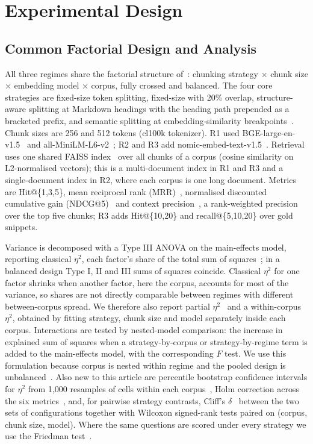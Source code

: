 \documentclass[runningheads]{llncs}
\begin{document}
\section{Experimental Design}
\label{sec:design}

\subsection{Common Factorial Design and Analysis}
All three regimes share the factorial structure of~\cite{chauhan2026chunking}: chunking strategy $\times$ chunk size $\times$ embedding model $\times$ corpus, fully crossed and balanced. The four core strategies are fixed-size token splitting, fixed-size with 20\% overlap, structure-aware splitting at Markdown headings with the heading path prepended as a bracketed prefix, and semantic splitting at embedding-similarity breakpoints~\cite{kamradt2023}. Chunk sizes are 256 and 512 tokens (cl100k tokenizer). R1 used BGE-large-en-v1.5~\cite{xiao2023cpack} and all-MiniLM-L6-v2~\cite{reimers2019sbert}; R2 and R3 add nomic-embed-text-v1.5~\cite{nussbaum2024nomic}. Retrieval uses one shared FAISS index~\cite{johnson2021faiss} over all chunks of a corpus (cosine similarity on L2-normalised vectors); this is a multi-document index in R1 and R3 and a single-document index in R2, where each corpus is one long document. Metrics are Hit@\{1,3,5\}, mean reciprocal rank (MRR)~\cite{craswell2009mrr}, normalised discounted cumulative gain (NDCG@5)~\cite{jarvelin2002ndcg} and context precision~\cite{es2024ragas}, a rank-weighted precision over the top five chunks; R3 adds Hit@\{10,20\} and recall@\{5,10,20\} over gold snippets.

Variance is decomposed with a Type III ANOVA on the main-effects model, reporting classical $\eta^2$, each factor's share of the total sum of squares~\cite{richardson2011,lakens2013}; in a balanced design Type I, II and III sums of squares coincide. Classical $\eta^2$ for one factor shrinks when another factor, here the corpus, accounts for most of the variance, so shares are not directly comparable between regimes with different between-corpus spread. We therefore also report partial $\eta^2$~\cite{richardson2011} and a within-corpus $\eta^2$, obtained by fitting strategy, chunk size and model separately inside each corpus. Interactions are tested by nested-model comparison: the increase in explained sum of squares when a strategy-by-corpus or strategy-by-regime term is added to the main-effects model, with the corresponding $F$ test. We use this formulation because corpus is nested within regime and the pooled design is unbalanced~\cite{langsrud2003}. Also new to this article are percentile bootstrap confidence intervals for $\eta^2$ from 1,000 resamples of cells within each corpus~\cite{efron1986bootstrap}, Holm correction across the six metrics~\cite{holm1979}, and, for pairwise strategy contrasts, Cliff's $\delta$~\cite{cliff1993} between the two sets of configurations together with Wilcoxon signed-rank tests paired on (corpus, chunk size, model). Where the same questions are scored under every strategy we use the Friedman test~\cite{demsar2006}.
\end{document}
